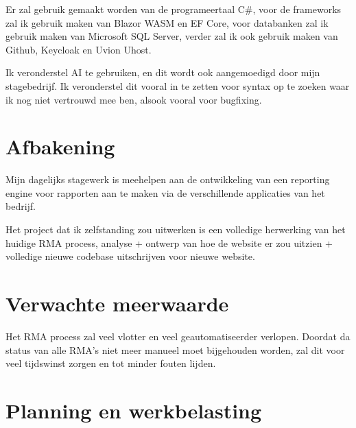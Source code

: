 Er zal gebruik gemaakt worden van de programeertaal C\#, voor de frameworks zal ik gebruik maken van Blazor WASM en EF Core, voor databanken zal ik gebruik maken van Microsoft SQL Server, verder zal ik ook gebruik maken van Github, Keycloak en Uvion Uhost.

Ik veronderstel AI te gebruiken, en dit wordt ook aangemoedigd door mijn stagebedrijf. Ik veronderstel dit vooral in te zetten voor syntax op te zoeken waar ik nog niet vertrouwd mee ben, alsook vooral voor bugfixing.


\section{Afbakening}%
\label{vst:afbakening}

Mijn dagelijks stagewerk is meehelpen aan de ontwikkeling van een reporting engine voor rapporten aan te maken via de verschillende applicaties van het bedrijf.

Het project dat ik zelfstanding zou uitwerken is een volledige herwerking van het huidige RMA process, analyse + ontwerp van hoe de website er zou uitzien + volledige nieuwe codebase uitschrijven voor nieuwe website.


\section{Verwachte meerwaarde}%
\label{vst:meerwaarde}

Het RMA process zal veel vlotter en veel geautomatiseerder verlopen. Doordat da status van alle RMA's niet meer manueel moet bijgehouden worden, zal dit voor veel tijdswinst zorgen en tot minder fouten lijden.


\section{Planning en werkbelasting}%
\label{vst:planning}


